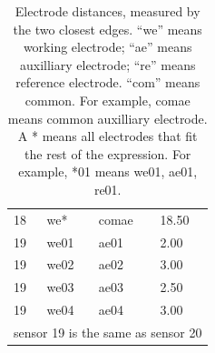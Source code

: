 \begin{table}
\begin{tabular}{llll}
		18 & we* & comae & 18.50 \\
		19 & we01 & ae01 & 2.00 \\
		19 & we02 & ae02 & 3.00 \\
		19 & we03 & ae03 & 2.50 \\
		19 & we04 & ae04 & 3.00 \\
		\multicolumn{4}{l}{sensor 19 is the same as sensor 20}
	\end{tabular}
	\caption[Electrode distances.]{Electrode distances, measured by the two closest edges. ``we'' means working electrode; ``ae'' means auxilliary electrode; ``re'' means reference electrode. ``com'' means common. For example, comae means common auxilliary electrode. A * means all electrodes that fit the rest of the expression. For example, *01 means we01, ae01, re01.}
	\label{electrode distance}
\end{table}
